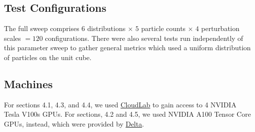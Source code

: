 \subsection{Test Configurations}

The full sweep comprises $6$ distributions $\times$ $5$ particle counts $\times$ $4$ perturbation scales $= 120$ configurations. There were also several tests run independently of this parameter sweep to gather general metrics which used a uniform distribution of particles on the unit cube. 

\subsection{Machines}
For sections 4.1, 4.3, and 4.4, we used \href{https://www.cloudlab.us/}{CloudLab} to gain access to 4 NVIDIA Tesla V100s GPUs. For sections, 4.2 and 4.5, we used NVIDIA A100 Tensor Core GPUs, instead, which were provided by \href{https://www.ncsa.illinois.edu/resources-and-services/compute-resources/delta/} {Delta}.


